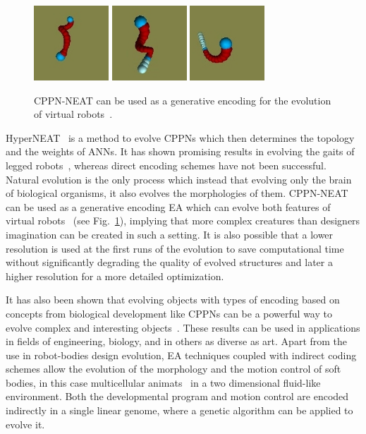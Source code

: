 \begin{figure}[t!]
\centering
\includegraphics[width=0.25\textwidth,height=0.2\textwidth]{../Figures/Misc/auerbach1.png}
\includegraphics[width=0.25\textwidth,height=0.2\textwidth]{../Figures/Misc/auerbach2.png}
\includegraphics[width=0.25\textwidth,height=0.2\textwidth]{../Figures/Misc/auerbach3.png}
\caption{CPPN-NEAT can be used as a generative encoding for the evolution of virtual robots~\citep{auerbach2010dynamic}.}
\label{fig:auerbach}
\end{figure}

HyperNEAT~\citep{stanley2009hypercube} is a method to evolve CPPNs which then determines the topology and the weights of ANNs. It has shown promising results in evolving the gaits of legged robots~\citep{clune2009evolving}, whereas direct encoding schemes have not been successful. Natural evolution is the only process which instead that evolving only the brain of biological organisms, it also evolves the morphologies of them. CPPN-NEAT~\citep{stanley2007compositional} can be used as a generative encoding EA which can evolve both features of virtual robots~\citep{auerbach2010dynamic, auerbach2010evolving} (see Fig.~\ref{fig:auerbach}), implying that more complex creatures than designers imagination can be created in such a setting. It is also possible that a lower resolution is used at the first runs of the evolution to save computational time without significantly degrading the quality of evolved structures and later a higher resolution for a more detailed optimization.

It has also been shown that evolving objects with types of encoding based on concepts from biological development like CPPNs can be a powerful way to evolve complex and interesting objects~\citep{clune2011evolving}. These results can be used in applications in fields of engineering, biology, and in others as diverse as art. Apart from the use in robot-bodies design evolution, EA techniques coupled with indirect coding schemes allow the evolution of the morphology and the motion control of soft bodies, in this case  multicellular animats~\citep{joachimczak2012co} in a two dimensional fluid-like environment. Both the developmental program and motion control are encoded indirectly in a single linear genome, where a genetic algorithm can be applied to evolve it.

